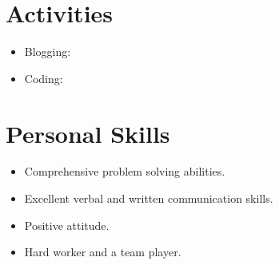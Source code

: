 \documentclass[11pt,a4paper]{moderncv}
\begin{document}

\section{Activities}
	\begin{itemize}
		\item{ Blogging: \textcolor{gray}{}}
		\item{ Coding: \textcolor{gray}{}}
	\end{itemize}
	
	



\section{Personal Skills}
	\begin{itemize}
		\item{ Comprehensive problem solving abilities.}
		\item{ Excellent verbal and written communication skills.}
		\item{ Positive attitude.}
		\item{ Hard worker and a team player.}

	\end{itemize}
	

\end{document}
